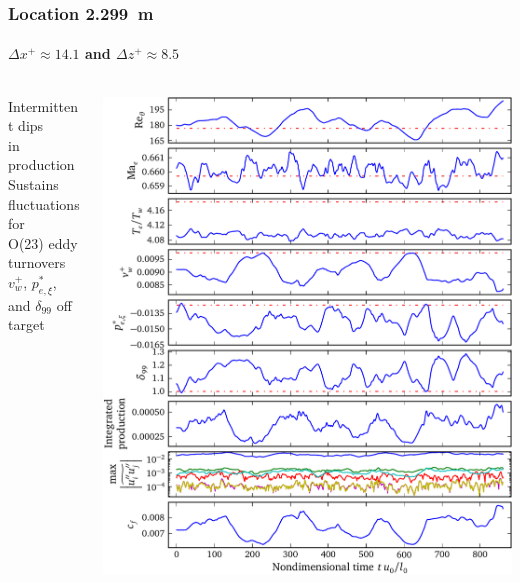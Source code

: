 \documentclass[mathserif]{beamer}
\begin{document}
\begin{frame}
    \frametitle{Location 2.299~m}
    \framesubtitle{$\Delta{}x^{+}\approx{}14.1$ and $\Delta{}z^{+}\approx{}8.5$}
    \begin{columns}[c,onlytextwidth]
    \begin{column}{.35\linewidth}
        \scriptsize
        Intermittent dips\\in production
        \\\bigskip
        Sustains fluctuations for\\O(23) eddy turnovers
        \\\bigskip
        $v_w^{+}$, $p_{e,\xi}^\ast$, and $\delta_{99}$ off target
    \end{column}
    \begin{column}{.65\linewidth}
        \vspace{-3.75em}
        \begin{flushright}
            \includegraphics[height=0.99\textheight]{relam2299}
        \end{flushright}
    \end{column}
    \end{columns}
\end{frame}
\end{document}

